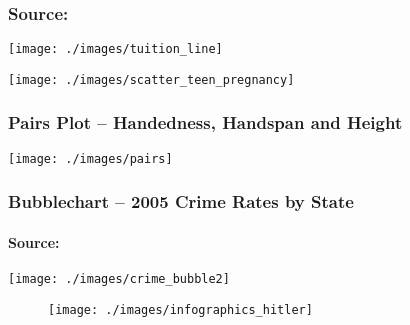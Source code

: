 \documentclass{beamer}
\begin{document}

\begin{frame}
\frametitle{\footnotesize Source: \href{http://www.aeaweb.org/articles.php?doi=10.1257/jep.26.1.165}{}}
\begin{center}
\texttt{[image: ./images/tuition\_line]}
\end{center}
\end{frame}






\begin{frame}
\begin{center}
\texttt{[image: ./images/scatter\_teen\_pregnancy]}
\end{center}
\end{frame}

\begin{frame}
\frametitle{Pairs Plot -- Handedness, Handspan and Height}
\begin{center}
\texttt{[image: ./images/pairs]}
\end{center}
\end{frame}






\begin{frame}
\frametitle{Bubblechart -- 2005 Crime Rates by State}
\framesubtitle{Source: \href{http://flowingdata.com}{}}
\centering
\texttt{[image: ./images/crime\_bubble2]}

\end{frame}


\begin{frame}
\begin{figure}
\texttt{[image: ./images/infographics\_hitler]}
\end{figure}

\end{frame}

\end{document}
